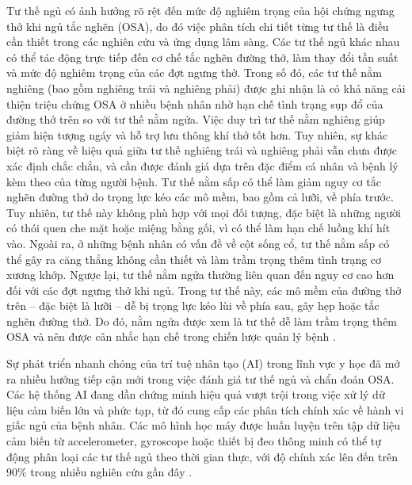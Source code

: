 Tư thế ngủ có ảnh hưởng rõ rệt đến mức độ nghiêm trọng của hội chứng ngưng thở khi ngủ tắc nghẽn (OSA), do đó việc phân tích chi tiết từng tư thế là điều cần thiết trong các nghiên cứu và ứng dụng lâm sàng. Các tư thế ngủ khác nhau có thể tác động trực tiếp đến cơ chế tắc nghẽn đường thở, làm thay đổi tần suất và mức độ nghiêm trọng của các đợt ngưng thở. Trong số đó, các tư thế nằm nghiêng (bao gồm nghiêng trái và nghiêng phải) được ghi nhận là có khả năng cải thiện triệu chứng OSA ở nhiều bệnh nhân nhờ hạn chế tình trạng sụp đổ của đường thở trên so với tư thế nằm ngửa. Việc duy trì tư thế nằm nghiêng giúp giảm hiện tượng ngáy và hỗ trợ lưu thông khí thở tốt hơn. Tuy nhiên, sự khác biệt rõ ràng về hiệu quả giữa tư thế nghiêng trái và nghiêng phải vẫn chưa được xác định chắc chắn, và cần được đánh giá dựa trên đặc điểm cá nhân và bệnh lý kèm theo của từng người bệnh. Tư thế nằm sấp có thể làm giảm nguy cơ tắc nghẽn đường thở do trọng lực kéo các mô mềm, bao gồm cả lưỡi, về phía trước. Tuy nhiên, tư thế này không phù hợp với mọi đối tượng, đặc biệt là những người có thói quen che mặt hoặc miệng bằng gối, vì có thể làm hạn chế luồng khí hít vào. Ngoài ra, ở những bệnh nhân có vấn đề về cột sống cổ, tư thế nằm sấp có thể gây ra căng thẳng không cần thiết và làm trầm trọng thêm tình trạng cơ xương khớp. Ngược lại, tư thế nằm ngửa thường liên quan đến nguy cơ cao hơn đối với các đợt ngưng thở khi ngủ. Trong tư thế này, các mô mềm của đường thở trên – đặc biệt là lưỡi – dễ bị trọng lực kéo lùi về phía sau, gây hẹp hoặc tắc nghẽn đường thở. Do đó, nằm ngửa được xem là tư thế dễ làm trầm trọng thêm OSA và nên được cân nhắc hạn chế trong chiến lược quản lý bệnh \cite{LANDRY2023101847}.

Sự phát triển nhanh chóng của trí tuệ nhân tạo (AI) trong lĩnh vực y học đã mở ra nhiều hướng tiếp cận mới trong việc đánh giá tư thế ngủ và chẩn đoán OSA. Các hệ thống AI đang dần chứng minh hiệu quả vượt trội trong việc xử lý dữ liệu cảm biến lớn và phức tạp, từ đó cung cấp các phân tích chính xác về hành vi giấc ngủ của bệnh nhân. Các mô hình học máy được huấn luyện trên tập dữ liệu cảm biến từ accelerometer, gyroscope hoặc thiết bị đeo thông minh có thể tự động phân loại các tư thế ngủ theo thời gian thực, với độ chính xác lên đến trên 90\% trong nhiều nghiên cứu gần đây \cite{Sleep_Posture_Detection}\cite{Vu2025SleepPosition}\cite{HOANG2025116309}. 

